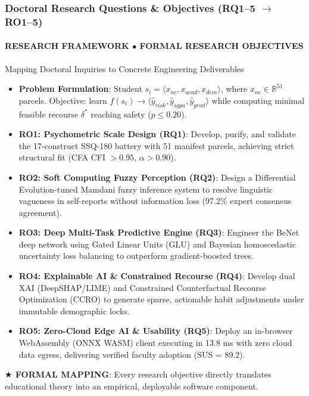 \documentclass[aspectratio=169, 10pt]{beamer}
\newcommand{\leadbullet}[2]{\textbf{\color{NavyDark}#1}: \color{TextBody}#2}
\begin{document}
\begin{frame}
  \frametitle{Doctoral Research Questions \& Objectives (RQ1--5 $\to$ RO1--5)}
  \framesubtitle{RESEARCH FRAMEWORK $\bullet$ FORMAL RESEARCH OBJECTIVES}

  \begin{defensecard}{Mapping Doctoral Inquiries to Concrete Engineering Deliverables}
    \begin{itemize}\setlength{\itemsep}{2.5pt}\setlength{\parskip}{0pt}\fontsize{8.2pt}{10.2pt}\selectfont
      \item \leadbullet{Problem Formulation}{Student $s_i = \langle x_{nc}, x_{acad}, x_{dem} \rangle$, where $x_{nc} \in \mathbb{R}^{51}$ parcels. Objective: learn $f(s_i) \to \langle \hat{y}_{risk}, \hat{y}_{sgpa}, \hat{y}_{grad} \rangle$ while computing minimal feasible recourse $\delta^*$ reaching safety ($p \le 0.20$).}
      \item \leadbullet{RO1: Psychometric Scale Design (RQ1)}{Develop, purify, and validate the 17-construct SSQ-180 battery with 51 manifest parcels, achieving strict structural fit (CFA CFI $> 0.95$, $\alpha > 0.90$).}
      \item \leadbullet{RO2: Soft Computing Fuzzy Perception (RQ2)}{Design a Differential Evolution-tuned Mamdani fuzzy inference system to resolve linguistic vagueness in self-reports without information loss (97.2\% expert consensus agreement).}
      \item \leadbullet{RO3: Deep Multi-Task Predictive Engine (RQ3)}{Engineer the BeNet deep network using Gated Linear Units (GLU) and Bayesian homoscedastic uncertainty loss balancing to outperform gradient-boosted trees.}
      \item \leadbullet{RO4: Explainable AI \& Constrained Recourse (RQ4)}{Develop dual XAI (DeepSHAP/LIME) and Constrained Counterfactual Recourse Optimization (CCRO) to generate sparse, actionable habit adjustments under immutable demographic locks.}
      \item \leadbullet{RO5: Zero-Cloud Edge AI \& Usability (RQ5)}{Deploy an in-browser WebAssembly (ONNX WASM) client executing in 13.8 ms with zero cloud data egress, delivering verified faculty adoption (SUS = 89.2).}
    \end{itemize}
  \end{defensecard}
  \vspace{-0.1cm}

  \begin{takeawaybanner}
    \textbf{\color{GoldPill}$\bigstar$ FORMAL MAPPING}: Every research objective directly translates educational theory into an empirical, deployable software component.
  \end{takeawaybanner}
\end{frame}
\end{document}
